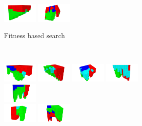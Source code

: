 \begin{figure}[t!]
\begin{subfigure}[b]{1.0\textwidth}
\includegraphics[width=0.19\textwidth]{../Figures/Robots/f_4_g_900.jpg}
\includegraphics[width=0.19\textwidth]{../Figures/Robots/f_4_g_1000.jpg}
\caption{Fitness based search}
\end{subfigure}\\
\begin{subfigure}[b]{1.0\textwidth}
\includegraphics[width=0.19\textwidth]{../Figures/Robots/n_4_g_100.jpg}
\includegraphics[width=0.19\textwidth]{../Figures/Robots/n_4_g_200.jpg}
\includegraphics[width=0.19\textwidth]{../Figures/Robots/n_4_g_300.jpg}
\includegraphics[width=0.19\textwidth]{../Figures/Robots/n_4_g_400.jpg}
\includegraphics[width=0.19\textwidth]{../Figures/Robots/n_4_g_500.jpg}\\
\includegraphics[width=0.19\textwidth]{../Figures/Robots/n_4_g_600.jpg}
\includegraphics[width=0.19\textwidth]{../Figures/Robots/n_4_g_700.jpg}

\end{subfigure}
\end{figure}
